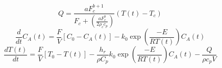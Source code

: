\begin{equation*}
  Q = \frac{aF_{c}^{b+1}}{F_{c} + (\frac{aF_{c}^{b}}{2\rho_{c}c_{p}})}(T(t)-T_{c})
\end{equation*}
\begin{equation}
  \frac{d}{dt} C_{A}(t) = \frac{F}{V}[C_{0} - C_{A}(t)] - k_{0} \exp(\frac{-E}{RT(t)}) C_{A}(t)
  \label{eq:CSTR_1storder02_3}
\end{equation}
\begin{equation*}
  \frac{dT(t)}{dt} = \frac{F}{V} [T_{0}-T(t)] - \frac{h_{r}}{\rho C_{p}}k_{0} \exp(\frac{-E}{RT(t)}) C_{A}(t) - \frac{Q}{\rho c_{p} V}
\end{equation*}